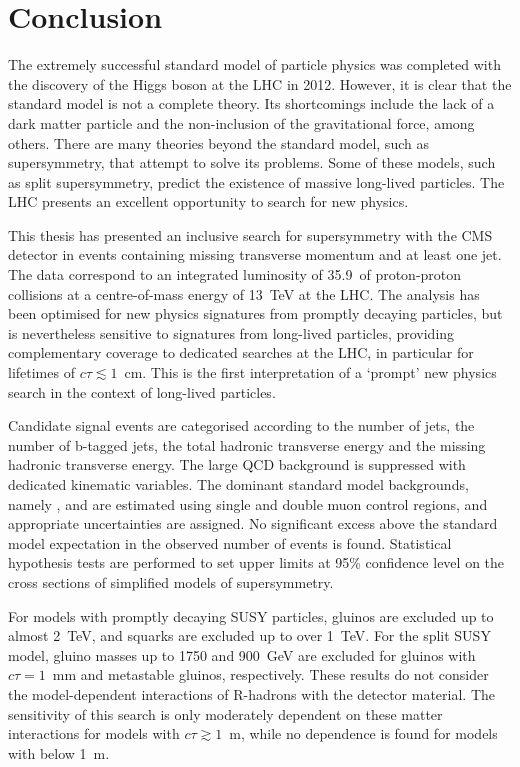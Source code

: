 \chapter{Conclusion}
\label{chap:conclusion}
The extremely successful standard model of particle physics was completed with 
the discovery of the Higgs boson at the LHC in 2012. However, it is clear that 
the standard model is not a complete theory. Its shortcomings 
include the lack of a dark matter particle and the non-inclusion of the 
gravitational force, %
among others. There are many theories beyond the 
standard model, such as supersymmetry, that attempt to solve its problems. Some 
of these models, such as split supersymmetry, predict the existence of massive 
long-lived particles. The LHC presents an excellent opportunity to search for 
new physics.

This thesis has presented an inclusive search for supersymmetry with the CMS 
detector in events containing missing transverse momentum and at least one jet. 
The data correspond to an integrated luminosity of 35.9~\ifb of proton-proton 
collisions at a centre-of-mass energy of 13~TeV at the LHC. The analysis has 
been optimised for new physics signatures from promptly decaying particles, but 
is nevertheless sensitive to signatures from long-lived particles, providing 
complementary coverage to dedicated searches at the LHC, in particular for 
lifetimes of $c\tau \lesssim 1$~cm. This is the first 
interpretation of a `prompt' new physics search in the context of long-lived 
particles.

Candidate signal events are categorised according to the number of jets, the 
number of b-tagged jets, the total hadronic transverse energy and the missing 
hadronic transverse energy. The large QCD background is suppressed with 
dedicated kinematic variables. The dominant standard model backgrounds, namely 
\znnj, \wlj and \ttbar are estimated using single and double muon control 
regions, and appropriate uncertainties are assigned. No significant excess 
above the standard model expectation in the observed number of events is found. 
Statistical hypothesis tests are performed to set upper limits at 95\% 
confidence level on the cross sections of simplified models of supersymmetry. 

For models with promptly decaying SUSY particles, gluinos are excluded up to 
almost 2~TeV, and squarks are excluded up to over 1~TeV. 
For the split SUSY model, gluino masses up to 1750 and 900~GeV are 
excluded for gluinos with $c\tau=1$~mm and metastable gluinos, respectively. 
These results do not consider the model-dependent interactions of R-hadrons 
with the detector material. The sensitivity of this search is only moderately 
dependent on these matter interactions for models with $c\tau \gtrsim 1$~m, 
while no dependence is found for models with \ctau below 1~m.

